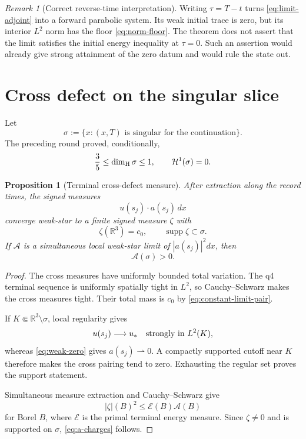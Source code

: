 \documentclass[11pt]{article}
\newtheorem{proposition}[theorem]{Proposition}
\theoremstyle{remark}
\newtheorem{remark}[theorem]{Remark}
\newcommand{\R}{\mathbb R}
\newcommand{\supp}{\operatorname{supp}}
\newcommand{\weakto}{\rightharpoonup}
\begin{document}
\begin{remark}[Correct reverse-time interpretation]
Writing \(\tau=T-t\) turns \eqref{eq:limit-adjoint} into a forward
parabolic system.  Its weak initial trace is zero, but its interior
\(L^2\) norm has the floor \eqref{eq:norm-floor}.  The theorem does not
assert that the limit satisfies the initial energy inequality at
\(\tau=0\).  Such an assertion would already give strong attainment of
the zero datum and would rule the state out.
\end{remark}

\section{Cross defect on the singular slice}

Let
\[
 \sigma
 :=
 \{x:(x,T)\text{ is singular for the continuation}\}.
\]
The preceding round proved, conditionally,
\[
 \frac35\leq\dim_{\rm H}\sigma\leq1,
 \qquad
 \mathcal H^1(\sigma)=0.
\]

\begin{proposition}[Terminal cross-defect measure]
\label{prop:cross}
After extraction along the record times, the signed measures
\[
 u(s_j)\cdot a(s_j)\,dx
\]
converge weak-star to a finite signed measure \(\zeta\) with
\begin{equation}
 \label{eq:cross}
 \boxed{
 \zeta(\R^3)=c_0,
 \qquad
 \supp\zeta\subset\sigma.
 }
\end{equation}
If \(\mathcal A\) is a simultaneous local weak-star limit of
\(|a(s_j)|^2dx\), then
\begin{equation}
 \label{eq:a-charges}
 \mathcal A(\sigma)>0.
\end{equation}
\end{proposition}

\begin{proof}
The cross measures have uniformly bounded total variation.  The q4
terminal sequence is uniformly spatially tight in \(L^2\), so
Cauchy--Schwarz makes the cross measures tight.  Their total mass is
\(c_0\) by \eqref{eq:constant-limit-pair}.

If \(K\Subset\R^3\setminus\sigma\), local regularity gives
\[
 u(s_j)\longrightarrow u_*
 \quad\hbox{strongly in }L^2(K),
\]
whereas \eqref{eq:weak-zero} gives \(a(s_j)\weakto0\).  A compactly
supported cutoff near \(K\) therefore makes the cross pairing tend to
zero.  Exhausting the regular set proves the support statement.

Simultaneous measure extraction and Cauchy--Schwarz give
\[
 |\zeta|(B)^2
 \leq
 \mathcal E(B)\mathcal A(B)
\]
for Borel \(B\), where \(\mathcal E\) is the primal terminal energy
measure.  Since \(\zeta\neq0\) and is supported on \(\sigma\),
\eqref{eq:a-charges} follows.
\end{proof}
\end{document}
